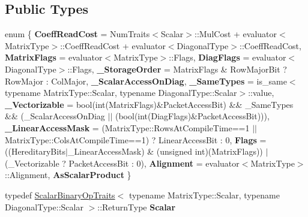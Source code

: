 \subsection*{Public Types}
\begin{DoxyCompactItemize}
\item 
\mbox{\label{struct_eigen_1_1internal_1_1diagonal__product__evaluator__base_ab41f7731f22cc474b7094bef3d869720}} 
enum \{ \newline
{\bfseries Coeff\+Read\+Cost} = Num\+Traits$<$Scalar$>$\+::Mul\+Cost + evaluator$<$Matrix\+Type$>$\+::Coeff\+Read\+Cost + evaluator$<$Diagonal\+Type$>$\+::Coeff\+Read\+Cost, 
{\bfseries Matrix\+Flags} = evaluator$<$Matrix\+Type$>$\+::Flags, 
{\bfseries Diag\+Flags} = evaluator$<$Diagonal\+Type$>$\+::Flags, 
{\bfseries \+\_\+\+Storage\+Order} = Matrix\+Flags \& Row\+Major\+Bit ? Row\+Major \+: Col\+Major, 
\newline
{\bfseries \+\_\+\+Scalar\+Access\+On\+Diag}, 
{\bfseries \+\_\+\+Same\+Types} = is\+\_\+same$<$typename Matrix\+Type\+::Scalar, typename Diagonal\+Type\+::Scalar$>$\+::value, 
{\bfseries \+\_\+\+Vectorizable} = bool(int(Matrix\+Flags)\&Packet\+Access\+Bit) \&\& \+\_\+\+Same\+Types \&\& (\+\_\+\+Scalar\+Access\+On\+Diag $\vert$$\vert$ (bool(int(Diag\+Flags)\&Packet\+Access\+Bit))), 
{\bfseries \+\_\+\+Linear\+Access\+Mask} = (Matrix\+Type\+::Rows\+At\+Compile\+Time==1 $\vert$$\vert$ Matrix\+Type\+::Cols\+At\+Compile\+Time==1) ? Linear\+Access\+Bit \+: 0, 
\newline
{\bfseries Flags} = ((Hereditary\+Bits$\vert$\+\_\+\+Linear\+Access\+Mask) \& (unsigned int)(Matrix\+Flags)) $\vert$ (\+\_\+\+Vectorizable ? Packet\+Access\+Bit \+: 0), 
{\bfseries Alignment} = evaluator$<$Matrix\+Type$>$\+::Alignment, 
{\bfseries As\+Scalar\+Product}
 \}
\item 
\mbox{\label{struct_eigen_1_1internal_1_1diagonal__product__evaluator__base_ad110e69ee2799e8dfeee209795641dfd}} 
typedef \mbox{\hyperlink{struct_eigen_1_1_scalar_binary_op_traits}{Scalar\+Binary\+Op\+Traits}}$<$ typename Matrix\+Type\+::\+Scalar, typename Diagonal\+Type\+::\+Scalar $>$\+::Return\+Type {\bfseries Scalar}
\end{DoxyCompactItemize}

